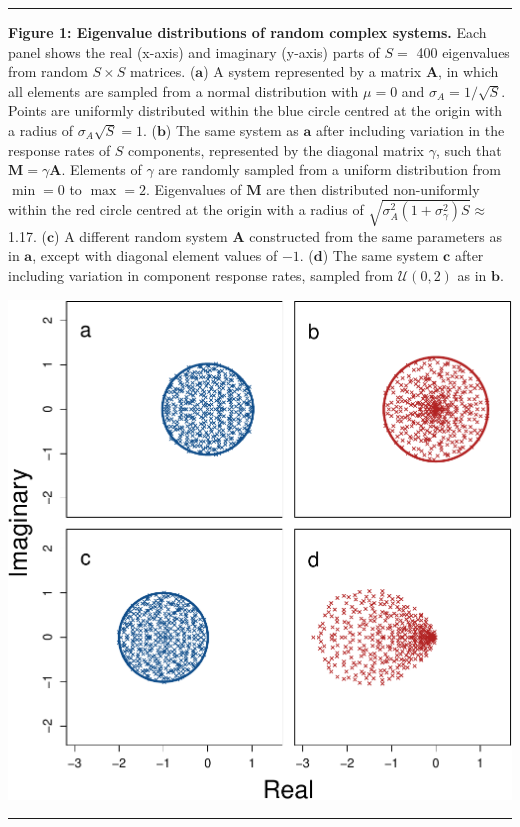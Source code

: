 \documentclass[]{article}
\begin{document}
\clearpage
\hrule
\vspace{2mm}
\textbf{Figure 1: Eigenvalue distributions of random complex systems.}
Each panel shows the real (x-axis) and imaginary (y-axis) parts of
\(S =\) 400 eigenvalues from random \(S \times S\) matrices.
(\(\textbf{a}\)) A system represented by a matrix \(\mathbf{A}\), in
which all elements are sampled from a normal distribution with
\(\mu = 0\) and \(\sigma_{A} = 1/\sqrt{S}\). Points are uniformly
distributed within the blue circle centred at the origin with a radius
of \(\sigma_{A} \sqrt{S} = 1\). (\(\textbf{b}\)) The same system as
\(\textbf{a}\) after including variation in the response rates of \(S\)
components, represented by the diagonal matrix \(\gamma\), such that
\(\mathbf{M} = \gamma\mathbf{A}\). Elements of \(\gamma\) are randomly
sampled from a uniform distribution from \(\min = 0\) to \(\max = 2\).
Eigenvalues of \(\mathbf{M}\) are then distributed non-uniformly within
the red circle centred at the origin with a radius of
\(\sqrt{\sigma^{2}_{A}(1 + \sigma^{2}_{\gamma})S} \approx\) 1.17.
(\(\textbf{c}\)) A different random system \(\mathbf{A}\) constructed
from the same parameters as in \(\textbf{a}\), except with diagonal
element values of \(-1\). (\(\textbf{d}\)) The same system
\(\textbf{c}\) after including variation in component response rates,
sampled from \(\mathcal{U}(0, 2)\) as in \(\textbf{b}\).

\includegraphics{fig1.pdf}
\vspace{2mm}
\hrule
\end{document}

